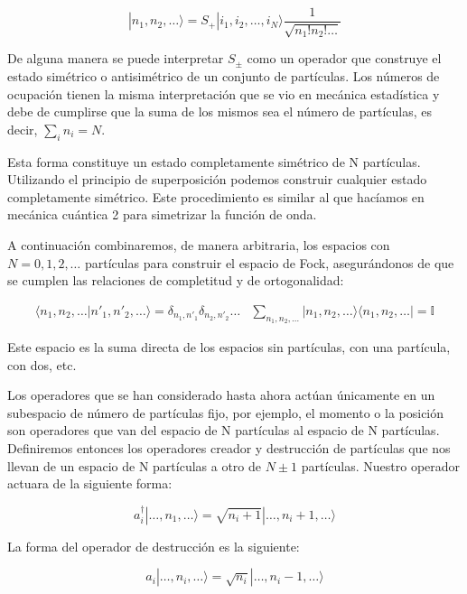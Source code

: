 \documentclass{article} %
\begin{document}
\begin{equation}
|n_1, n_2, \ldots \rangle = S_+ |i_1, i_2, \ldots, i_N \rangle \frac{1}{\sqrt{n_1 ! n_2 ! \ldots}}
\end{equation}

De alguna manera se puede interpretar $S_{\pm}$ como un operador que construye el estado simétrico o antisimétrico de un conjunto de partículas. Los números de ocupación tienen la misma interpretación que se vio en mecánica estadística y debe de cumplirse que la suma de los mismos sea el número de partículas, es decir, $\sum_i n_i = N$.

Esta forma constituye un estado completamente simétrico de N partículas. Utilizando el principio de superposición podemos construir cualquier estado completamente simétrico. Este procedimiento es similar al que hacíamos en mecánica cuántica 2 para simetrizar la función de onda.

A continuación combinaremos, de manera arbitraria, los espacios con $N = 0, 1, 2, \ldots$ partículas para construir el espacio de Fock, asegurándonos de que se cumplen las relaciones de completitud y de ortogonalidad:

$$
\begin{array}{cc}
\langle n_1, n_2, \ldots | n'_1, n'_2, \ldots \rangle = \delta_{n_1, n'_1} \delta_{n_2, n'_2} \ldots & \sum_{n_1, n_2, \ldots} |n_1, n_2, \ldots \rangle \langle n_1, n_2, \ldots | = \mathbb{I}
\end{array}
$$

Este espacio es la suma directa de los espacios sin partículas, con una partícula, con dos, etc. 

Los operadores que se han considerado hasta ahora actúan únicamente en un subespacio de número de partículas fijo, por ejemplo, el momento o la posición son operadores que van del espacio de N partículas al espacio de N partículas. Definiremos entonces los operadores creador y destrucción de partículas que nos llevan de un espacio de N partículas a otro de $N \pm 1$ partículas. Nuestro operador actuara de la siguiente forma:

\begin{equation}
a_i^{\dagger} |\ldots, n_1, \ldots \rangle = \sqrt{n_i + 1} |\ldots, n_i + 1, \ldots \rangle
\end{equation}

La forma del operador de destrucción es la siguiente:

\begin{equation}
a_i |\ldots, n_i, \ldots \rangle = \sqrt{n_i} |\ldots, n_i - 1, \ldots \rangle
\end{equation}
\end{document}
